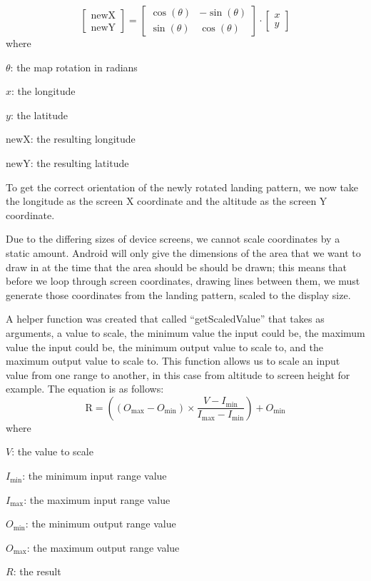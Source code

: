 \begin{equation}\label{eq:matrix-mult}
  \begin{bmatrix}
    \mathrm{newX} \\[0.3em]
    \mathrm{newY}
  \end{bmatrix}
  =
  \begin{bmatrix}
    \cos(\theta)  & -\sin(\theta) \\[0.3em]
    \sin(\theta) & \cos(\theta)
  \end{bmatrix}\cdot
  \begin{bmatrix}
    x \\[0.3em]
    y
  \end{bmatrix}
\end{equation}
where
\begin{description}
  \item $\theta$: the map rotation in radians
  \item $x$: the longitude
  \item $y$: the latitude
  \item $\mathrm{newX}$: the resulting longitude
  \item $\mathrm{newY}$: the resulting latitude
\end{description}

To get the correct orientation of the newly rotated landing pattern, we now take the longitude as the screen X coordinate and the altitude as the screen Y coordinate.

Due to the differing sizes of device screens, we cannot scale coordinates by a static amount. Android will only give the dimensions of the area that we want to draw in at the time that the area should be should be drawn; this means that before we loop through screen coordinates, drawing lines between them, we must generate those coordinates from the landing pattern, scaled to the display size.

A helper function was created that called ``getScaledValue'' that takes as arguments, a value to scale, the minimum value the input could be, the maximum value the input could be, the minimum output value to scale to, and the maximum output value to scale to. This function allows us to scale an input value from one range to another, in this case from altitude to screen height for example. The equation is as follows:
\begin{equation}\label{eq:scale-values}
  \mathrm{R} = \left((O_{\mathrm{max}} - O_{\mathrm{min}}) \times \frac{V - I_{\mathrm{min}}}{I_{\mathrm{max}} - I_{\mathrm{min}}}\right) + O_{\mathrm{min}}
\end{equation}
where
\begin{description}
  \item $V$: the value to scale
  \item $I_{\mathrm{min}}$: the minimum input range value
  \item $I_{\mathrm{max}}$: the maximum input range value
  \item $O_{\mathrm{min}}$: the minimum output range value
  \item $O_{\mathrm{max}}$: the maximum output range value
  \item $R$: the result
\end{description}

